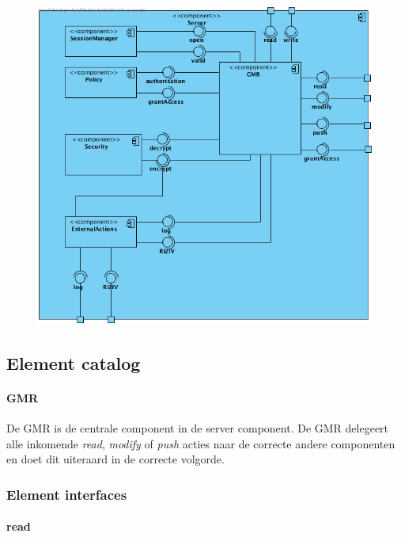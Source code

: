 \documentclass[a4paper,10pt]{article}
\begin{document}
\begin{center}
    \begin{figure}[!h]
      \includegraphics[width=\textwidth]{../images/ClientServer_Server.png}
    \end{figure}
  \end{center}

\subsection{Element catalog}

\paragraph{GMR}
De GMR is de centrale component in de server component.  De GMR delegeert alle inkomende \textit{read}, \textit{modify} of \textit{push} acties naar de correcte andere componenten en doet dit uiteraard in de correcte volgorde.

\subsubsection{Element interfaces} 

\paragraph{read}
\end{document}
